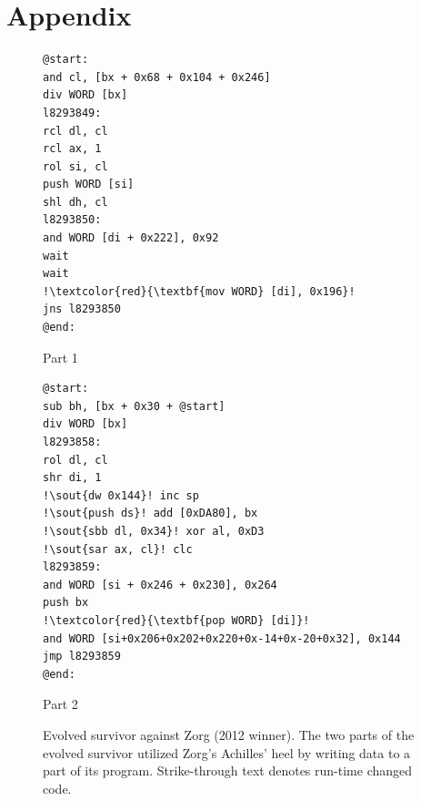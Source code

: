 \documentclass[dvipsnames, format=sigconf]{acmart}
\begin{document}
\section{Appendix}
\begin{figure}
\captionsetup{type=lstlisting}
\centering
\begin{sublstlisting}{0.45\textwidth}
\begin{lstlisting}
@start:
and cl, [bx + 0x68 + 0x104 + 0x246]
div WORD [bx]
l8293849:
rcl dl, cl
rcl ax, 1
rol si, cl
push WORD [si]
shl dh, cl
l8293850:
and WORD [di + 0x222], 0x92
wait
wait
!\textcolor{red}{\textbf{mov WORD} [di], 0x196}!
jns l8293850
@end:
\end{lstlisting}
\caption{Part 1}
\end{sublstlisting}
\hfill
\begin{sublstlisting}{0.45\textwidth}
\begin{lstlisting}
@start:
sub bh, [bx + 0x30 + @start]
div WORD [bx]
l8293858:
rol dl, cl
shr di, 1
!\sout{dw 0x144}! inc sp
!\sout{push ds}! add [0xDA80], bx
!\sout{sbb dl, 0x34}! xor al, 0xD3
!\sout{sar ax, cl}! clc
l8293859:
and WORD [si + 0x246 + 0x230], 0x264
push bx
!\textcolor{red}{\textbf{pop WORD} [di]}!
and WORD [si+0x206+0x202+0x220+0x-14+0x-20+0x32], 0x144
jmp l8293859
@end:
\end{lstlisting}
\caption{Part 2}
\end{sublstlisting}
\caption{Evolved survivor against Zorg (2012 winner). The two parts of the evolved survivor utilized Zorg's Achilles' heel by writing data to a part of its program. Strike-through text denotes run-time changed code.}
\label{evolved_zorg}
\end{figure}
\end{document}
